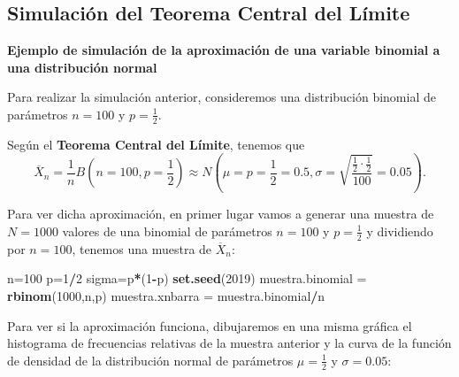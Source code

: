 \documentclass[]{book}
\newenvironment{Shaded}{\begin{snugshade}}{\end{snugshade}}
\newcommand{\DecValTok}[1]{\textcolor[rgb]{0.00,0.00,0.81}{#1}}
\newcommand{\KeywordTok}[1]{\textcolor[rgb]{0.13,0.29,0.53}{\textbf{#1}}}
\newcommand{\NormalTok}[1]{#1}
\newcommand{\OperatorTok}[1]{\textcolor[rgb]{0.81,0.36,0.00}{\textbf{#1}}}
\newcommand{\StringTok}[1]{\textcolor[rgb]{0.31,0.60,0.02}{#1}}
\begin{document}
\hypertarget{simulaciuxf3n-del-teorema-central-del-luxedmite}{%
\subsection{Simulación del Teorema Central del Límite}\label{simulaciuxf3n-del-teorema-central-del-luxedmite}}

\textbf{Ejemplo de simulación de la aproximación de una variable binomial a una distribución normal}

Para realizar la simulación anterior, consideremos una distribución binomial de parámetros \(n=100\) y \(p=\frac{1}{2}\).

Según el \textbf{Teorema Central del Límite}, tenemos que
\[
\overline{X}_n=\frac{1}{n}B\left(n=100,p=\frac{1}{2}\right)\approx N\left(\mu = p=\frac{1}{2}=0.5,\sigma=\sqrt{\frac{\frac{1}{2}\cdot \frac{1}{2}}{100}}=0.05\right).
\]

Para ver dicha aproximación, en primer lugar vamos a generar una muestra de \(N=1000\) valores de una binomial de parámetros \(n=100\) y \(p=\frac{1}{2}\) y dividiendo por \(n=100\), tenemos una muestra de \(\overline{X}_n\):

\begin{Shaded}
\begin{Highlighting}[]
\NormalTok{n=}\DecValTok{100}
\NormalTok{p=}\DecValTok{1}\OperatorTok{/}\DecValTok{2}
\NormalTok{sigma=p}\OperatorTok{*}\NormalTok{(}\DecValTok{1}\OperatorTok{-}\NormalTok{p)}
\KeywordTok{set.seed}\NormalTok{(}\DecValTok{2019}\NormalTok{)}
\NormalTok{muestra.binomial =}\StringTok{ }\KeywordTok{rbinom}\NormalTok{(}\DecValTok{1000}\NormalTok{,n,p)}
\NormalTok{muestra.xnbarra =}\StringTok{ }\NormalTok{muestra.binomial}\OperatorTok{/}\NormalTok{n}
\end{Highlighting}
\end{Shaded}

Para ver si la aproximación funciona, dibujaremos en una misma gráfica el histograma de frecuencias relativas de la muestra anterior y la curva de la función de densidad de la distribución normal de parámetros \(\mu =\frac{1}{2}\) y \(\sigma = 0.05\):
\end{document}
